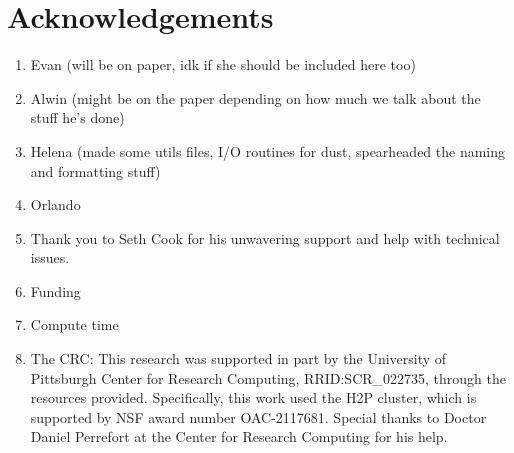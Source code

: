 \section{Acknowledgements}

\begin{enumerate}
    \item Evan (will be on paper, idk if she should be included here too)
    \item Alwin (might be on the paper depending on how much we talk about the stuff he's done)
    \item Helena (made some utils files, I/O routines for dust, spearheaded the naming and formatting stuff)
    \item Orlando
    \item Thank you to Seth Cook for his unwavering support and help with technical issues.
    \item Funding
    \item Compute time
    \item The CRC: This research was supported in part by the University of Pittsburgh Center for Research Computing, RRID:SCR\_022735, through the resources provided. Specifically, this work used the H2P cluster, which is supported by NSF award number OAC-2117681. Special thanks to Doctor Daniel Perrefort at the Center for Research Computing for his help.
\end{enumerate}